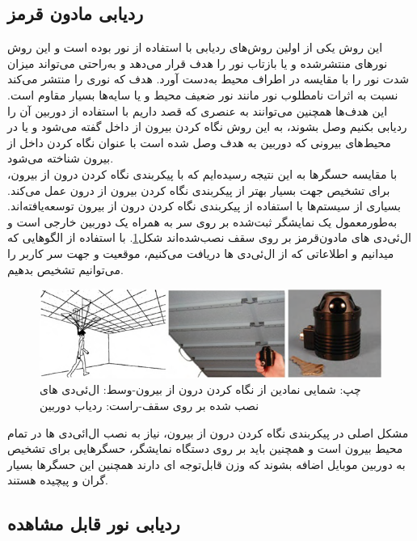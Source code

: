 \subsection{ردیابی مادون قرمز\protect{}}
این روش یکی از اولین روش‌های ردیابی با استفاده از نور بوده است و این روش نورهای منتشرشده و یا بازتاب نور را هدف قرار می‌دهد و به‌راحتی می‌تواند میزان شدت نور را با مقایسه در اطراف محیط به‌دست آورد\cite{bajura1995dynamic}. هدف که نوری را منتشر می‌کند نسبت به اثرات نامطلوب نور مانند نور ضعیف محیط و یا سایه‌ها بسیار مقاوم است. این هدف‌ها همچنین می‌توانند به عنصری که قصد داریم با استفاده از دوربین آن را ردیابی بکنیم وصل بشوند، به این روش نگاه کردن بیرون از داخل \cite{ribo2001new}گفته می‌شود و یا در محیط‌های بیرونی که دوربین به هدف وصل شده است با عنوان نگاه کردن داخل از بیرون شناخته می‌شود\cite{gottschalk1993autocalibration}. 
\\
با مقایسه حسگرها به این نتیجه رسیده‌ایم که با پیکربندی نگاه کردن درون از بیرون، برای تشخیص جهت بسیار بهتر از پیکربندی نگاه کردن بیرون از درون عمل می‌کند. بسیاری از سیستم‌ها با استفاده از پیکربندی نگاه کردن درون از بیرون  توسعه‌یافته‌اند. به‌طورمعمول یک نمایشگر ثبت‌شده بر روی سر  به همراه یک دوربین  خارجی است و ال‌ئی‌دی های مادون‌قرمز بر روی سقف نصب‌شده‌اند شکل\ref{fig:infrared}. با استفاده از الگوهایی که میدانیم و اطلاعاتی که از ال‌ئی‌دی ها دریافت می‌کنیم، موقعیت و جهت سر کاربر را می‌توانیم تشخیص بدهیم\cite{welch1999hiball}.
\begin{figure}
	\centering
	\includegraphics[width=1\linewidth]{image/infrared}
	\caption {چپ: شمایی نمادین از نگاه کردن درون از بیرون-وسط: ال‌ئی‌دی های نصب شده بر روی سقف-راست: ردیاب دوربین\cite{welch1999hiball}}
	\label{fig:infrared}
\end{figure}

مشکل اصلی در پیکربندی نگاه کردن درون از بیرون، نیاز به نصب ال‌ائی‌دی ها در تمام محیط بیرون است و همچنین باید بر روی دستگاه نمایشگر، حسگرهایی برای تشخیص به دوربین موبایل اضافه بشوند که وزن قابل‌توجه ای دارند همچنین این حسگرها بسیار گران و پیچیده هستند.

\subsection{ردیابی نور قابل مشاهده\protect{}}

